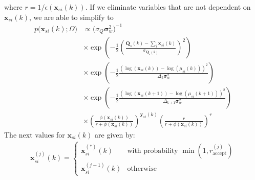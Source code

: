\documentclass{article}
\newcommand{\pv}{\mathbf{\sigma}_w^2}
\newcommand{\musik}[3]{\mu_{#1 #2}(#3)}
\newcommand{\xsik}[3]{\mathbf{x}_{#1 #2}(#3)}
\newcommand{\xsikexp}[4]{\mathbf{x}^{#4}_{#1 #2}(#3)}
\newcommand{\countsik}[3]{\mathbf{y}_{#1 #2}(#3)}
\newcommand{\qpcrsk}[2]{\mathbf{Q}_{#1}(#2)}
\newcommand{\dt}{\Delta_k}
\newcommand{\dtk}[1]{\Delta_{#1}} %
\begin{document}
where $r = 1/\epsilon(\xsik{s}{i}{k})$. If we eliminate variables that are not dependent on $\xsik{s}{i}{k}$, we are able to simplify to
\begin{align}
    p \Big(  \xsik{s}{i}{k} ; \Omega \Big) & \propto 
        \Big( \sigma_Q \pv \Big)^{-1} \\
        & \times \exp \left(
            -\frac{1}{2} 
            \left(\frac
                {\qpcrsk{s}{k} - \sum_i \xsik{s}{i}{k}}
                {\sigma_{\qpcrsk{s}{k}}} \right)^2 \right) \nonumber \\ 
        & \times \exp \left(
            -\frac{1}{2} 
            \frac
                {\left(
                    \log \left(\xsik{s}{i}{k} \right) - 
                    \log \left(\musik{s}{i}{k} \right) \right)^2 }
                { \dt  \pv} \right) \nonumber \\ 
        & \times \exp \left(
            -\frac{1}{2} 
            \frac
                {\left(
                   \log \left( \xsik{s}{i}{k+1} \right) - 
                   \log \left( \musik{s}{i}{k+1} \right) 
                \right)^2 }
                { \dtk{k+1} \pv} \right) \nonumber \\
        & \times
            \left(
                \frac
                    {\phi (\xsik{s}{i}{k})}
                    {r + \phi(\xsik{s}{i}{k})}
            \right)^{\countsik{s}{i}{k}}
            \left(
                \frac{r}{r + \phi(\xsik{s}{i}{k})}
            \right)^r \nonumber
\end{align}
The next values for $\xsik{s}{i}{k}$ are given by:
\begin{align}
    \xsikexp{s}{i}{k}{(j)} = \begin{cases}
        \xsikexp{s}{i}{k}{(*)} & \text{with probability }     
            \min(1, r^{(j)}_{\text{accept}}) \\
        \xsikexp{s}{i}{k}{(j-1)} & \text{otherwise}
    \end{cases}
\end{align}
\end{document}
